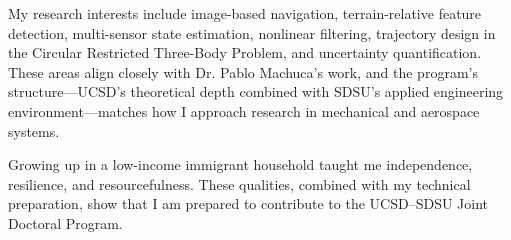 \documentclass[11pt]{article}
\begin{document}
	My research interests include image-based navigation, terrain-relative feature detection, multi-sensor state estimation, nonlinear filtering, trajectory design in the Circular Restricted Three-Body Problem, and uncertainty quantification. These areas align closely with Dr. Pablo Machuca’s work, and the program’s structure—UCSD’s theoretical depth combined with SDSU’s applied engineering environment—matches how I approach research in mechanical and aerospace systems.
	
	Growing up in a low-income immigrant household taught me independence, resilience, and resourcefulness. These qualities, combined with my technical preparation, show that I am prepared to contribute to the UCSD–SDSU Joint Doctoral Program.
	
\end{document}

